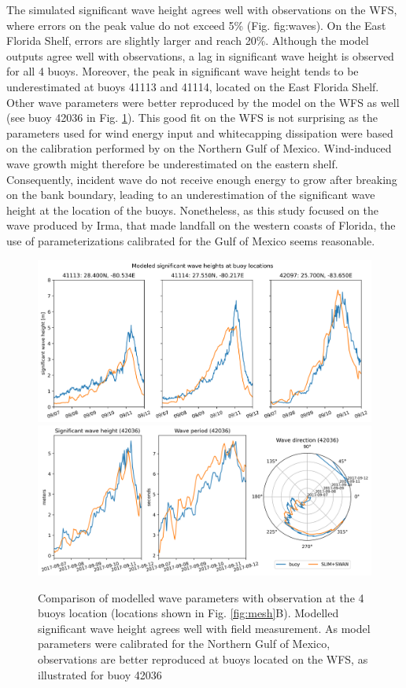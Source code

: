 \documentclass[11pt,a4paper]{article}
\begin{document}
The simulated significant wave height agrees well with observations on the WFS, where errors on the peak value do not exceed 5\% (Fig. {fig:waves}). On the East Florida Shelf, errors are slightly larger and reach 20\%. Although the model outputs agree well with observations, a lag in significant wave height is observed for all 4 buoys. Moreover, the peak in significant wave height tends to be underestimated at buoys 41113 and 41114, located on the East Florida Shelf. Other wave parameters were better reproduced by the model on the WFS as well (see buoy 42036 in Fig. \ref{fig:waves}). This good fit on the WFS is not surprising as the parameters used for wind energy input and whitecapping dissipation were based on the calibration performed by \cite{siadatmousavi2011evaluation} on the Northern Gulf of Mexico. Wind-induced wave growth might therefore be underestimated on the eastern shelf. Consequently, incident wave do not receive enough energy to grow after breaking on the bank boundary, leading to an underestimation of the significant wave height at the location of the buoys. Nonetheless, as this study focused on the wave produced by Irma, that made landfall on the western coasts of Florida, the use of parameterizations calibrated for the Gulf of Mexico seems reasonable.

\begin{figure}
    \centering
    \includegraphics[width=\textwidth]{fig/hsig_with_map_ww3.png}
    \includegraphics[width=\textwidth]{fig/waves_ww3_5km-00002.png}
    \caption{Comparison of modelled wave parameters with observation at the 4 buoys location (locations shown in Fig. \ref{fig:mesh}B). Modelled significant wave height agrees well with field measurement. As model parameters were calibrated for the Northern Gulf of Mexico, observations are better reproduced at buoys located on the WFS, as illustrated for buoy 42036}
    \label{fig:waves}
\end{figure}
\end{document}
